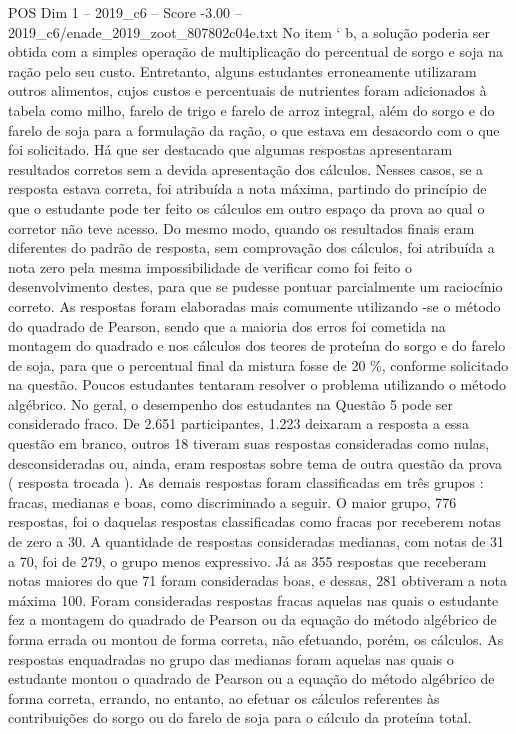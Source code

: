 \begin{textsample}{POS Dim 1 – 2019\_c6 – Score -3.00 – 2019\_c6/enade\_2019\_zoot\_807802c04e.txt}
No item ‘ b, a solução poderia ser obtida com a simples operação de multiplicação do percentual de sorgo e soja na ração pelo seu custo.
Entretanto, alguns estudantes erroneamente utilizaram outros alimentos, cujos custos e percentuais de nutrientes foram adicionados à tabela como milho, farelo de trigo e farelo de arroz integral, além do sorgo e do farelo de soja para a formulação da ração, o que estava em desacordo com o que foi solicitado.
Há que ser destacado que algumas respostas apresentaram resultados corretos sem a devida apresentação dos cálculos.
Nesses casos, se a resposta estava correta, foi atribuída a nota máxima, partindo do princípio de que o estudante pode ter feito os cálculos em outro espaço da prova ao qual o corretor não teve acesso.
Do mesmo modo, quando os resultados finais eram diferentes do padrão de resposta, sem comprovação dos cálculos, foi atribuída a nota zero pela mesma impossibilidade de verificar como foi feito o desenvolvimento destes, para que se pudesse pontuar parcialmente um raciocínio correto.
As respostas foram elaboradas mais comumente utilizando -se o método do quadrado de Pearson, sendo que a maioria dos erros foi cometida na montagem do quadrado e nos cálculos dos teores de proteína do sorgo e do farelo de soja, para que o percentual final da mistura fosse de 20 \%, conforme solicitado na questão.
Poucos estudantes tentaram resolver o problema utilizando o método algébrico.
No geral, o desempenho dos estudantes na Questão 5 pode ser considerado fraco.
De 2.651 participantes, 1.223 deixaram a resposta a essa questão em branco, outros 18 tiveram suas respostas consideradas como nulas, desconsideradas ou, ainda, eram respostas sobre tema de outra questão da prova ( resposta trocada ).
As demais respostas foram classificadas em três grupos : fracas, medianas e boas, como discriminado a seguir.
O maior grupo, 776 respostas, foi o daquelas respostas classificadas como fracas por receberem notas de zero a 30.
A quantidade de respostas consideradas medianas, com notas de 31 a 70, foi de 279, o grupo menos expressivo.
Já as 355 respostas que receberam notas maiores do que 71 foram consideradas boas, e dessas, 281 obtiveram a nota máxima 100.
Foram consideradas respostas fracas aquelas nas quais o estudante fez a montagem do quadrado de Pearson ou da equação do método algébrico de forma errada ou montou de forma correta, não efetuando, porém, os cálculos.
As respostas enquadradas no grupo das medianas foram aquelas nas quais o estudante montou o quadrado de Pearson ou a equação do método algébrico de forma correta, errando, no entanto, ao efetuar os cálculos referentes às contribuições do sorgo ou do farelo de soja para o cálculo da proteína total.

\end{textsample}
